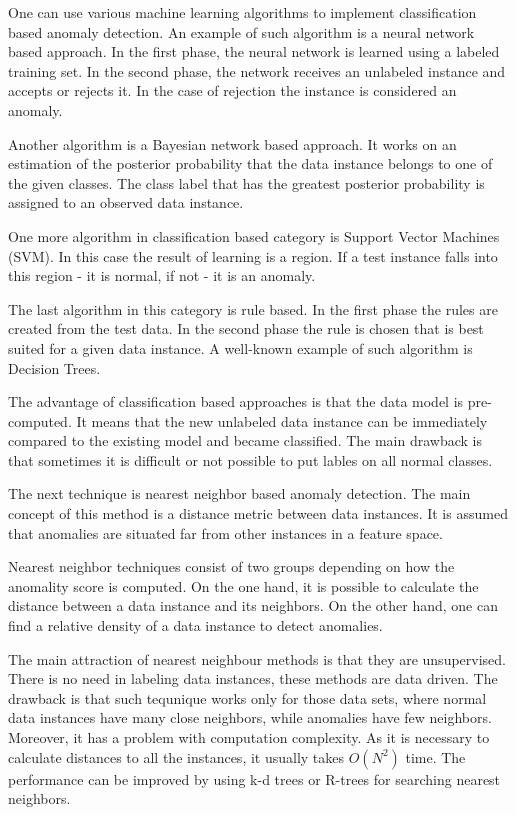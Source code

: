 One can use various machine learning algorithms to implement classification based anomaly detection.
An example of such algorithm is a neural network based approach.
In the first phase, the neural network is learned using a labeled training set. 
In the second phase, the network receives an unlabeled instance and accepts or rejects it.
In the case of rejection the instance is considered an anomaly.

Another algorithm is a Bayesian network based approach.
It works on an estimation of the posterior probability that the data instance belongs to one of the given classes.
The class label that has the greatest posterior probability is assigned to an observed data instance.

One more algorithm in classification based category is Support Vector Machines (SVM).
In this case the result of learning is a region.
If a test instance falls into this region - it is normal, if not - it is an anomaly.

The last algorithm in this category is rule based.
In the first phase the rules are created from the test data.
In the second phase the rule is chosen that is best suited for a given data instance. 
A well-known example of such algorithm is Decision Trees.

The advantage of classification based approaches is that the data model is pre-computed.
It means that the new unlabeled data instance can be immediately compared to the existing model and became classified.
The main drawback is that sometimes it is difficult or not possible to put lables on all normal classes.

The next technique is nearest neighbor based anomaly detection.
The main concept of this method is a distance metric between data instances.
It is assumed that anomalies are situated far from other instances in a feature space.

Nearest neighbor techniques consist of two groups depending on how the anomality score is computed.
On the one hand, it is possible to calculate the distance between a data instance and its neighbors.
On the other hand, one can find a relative density of a data instance to detect anomalies.

The main attraction of nearest neighbour methods is that they are unsupervised.
There is no need in labeling data instances, these methods are data driven.
The drawback is that such tequnique works only for those data sets, where normal data instances have many close neighbors, while anomalies have few neighbors.
Moreover, it has a problem with computation complexity.
As it is necessary to calculate distances to all the instances, it usually takes $O(N^2)$ time.
The performance can be improved by using k-d trees or R-trees for searching nearest neighbors.

